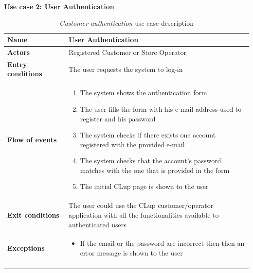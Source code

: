 \clearpage
\textbf{Use case 2: User Authentication}
\smallskip
{}
\begin{longtable}{p{0.25\linewidth}p{0.75\linewidth}}
    \toprule
    \textbf{Name}             & \textbf{User Authentication}                                                                                 \\
    \midrule
    \textbf{Actors}           & Registered Customer or Store Operator                                                                                         \\
    \midrule
    \textbf{Entry conditions} & The user requests the system to log-in                                                                       \\
    \midrule
    \textbf{Flow of events}   &
    \begin{enumerate}
        \item The system shows the authentication form
        \item The user fills the form with his e-mail address used to register and his password
        \item The system checks if there exists one account registered with the provided e-mail
        \item The system checks that the account's password matches with the one that is provided in the form
        \item The initial CLup page is shown to the user
    \end{enumerate}                                                                                                                \\
    \midrule
    \textbf{Exit conditions}  & The user could use the CLup customer/operator application with all the functionalities available to authenticated users\\
    \midrule
    \textbf{Exceptions}       &
    \begin{itemize}
        \item If the email or the password are incorrect then then an error message is shown to the user
    \end{itemize}                                                                                                                \\
    \bottomrule
    \caption{\emph{Customer authentication} use case description}
\end{longtable}

